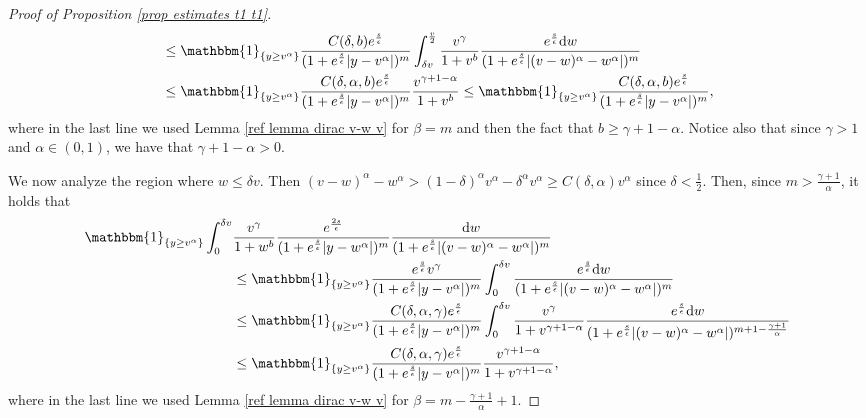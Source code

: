 \documentclass[11pt]{article}
\numberwithin{equation}{section}
\newcommand{\der}{\textup{d}}
\begin{document}
\begin{proof}[Proof of Proposition 
\ref{prop estimates t1 t1}]
\begin{align}
&\leq  \mathbbm{1}_{\{y\geq v^{\alpha}\}} \frac{C(\delta,b)e^{\frac{s}{\epsilon}}}{(1+e^{\frac{s}{\epsilon}}|y-v^{\alpha}|)^{m}}  \int_{\delta v}^{\frac{v}{2}} \frac{v^{\gamma}}{1+v^{b}}\frac{e^{\frac{s}{\epsilon}}\der w}{(1+e^{\frac{s}{\epsilon}}|(v-w)^{\alpha}-w^{\alpha}|)^{m}}\nonumber\\
&\leq  \mathbbm{1}_{\{y\geq v^{\alpha}\}} \frac{C(\delta,\alpha,b) e^{\frac{s}{\epsilon}}}{(1+e^{\frac{s}{\epsilon}}|y-v^{\alpha}|)^{m}}   \frac{ v^{\gamma+1-\alpha}}{1+v^{b}}\leq \mathbbm{1}_{\{y\geq v^{\alpha}\}}\frac{C(\delta,\alpha,b) e^{\frac{s}{\epsilon}}}{(1+e^{\frac{s}{\epsilon}}|y-v^{\alpha}|)^{m}},\label{part one}
\end{align}
where in the last line we used Lemma \ref{ref lemma dirac v-w v} for $\beta=m$ and then the fact that $b\geq \gamma+1-\alpha$. Notice also that since $\gamma>1$ and $\alpha\in(0,1)$, we have that $\gamma+1-\alpha>0$.

We now analyze the region where $w\leq \delta v$. Then $(v-w)^{\alpha}-w^{\alpha}>(1-\delta)^{\alpha}v^{\alpha}-\delta^{\alpha} v^{\alpha}\geq C(\delta,\alpha) v^{\alpha}$ since $\delta<\frac{1}{2}$. Then, since $m>\frac{\gamma+1}{\alpha}$, it holds that
  \begin{align}\label{part two}
    \mathbbm{1}_{\{y\geq v^{\alpha}\}}\int_{0}^{\delta v} & \frac{v^{\gamma}}{1+w^{b}}\frac{e^{\frac{2s}{\epsilon}}}{(1+e^{\frac{s}{\epsilon}}|y-w^{\alpha}|)^{m}}\frac{\der w}{(1+e^{\frac{s}{\epsilon}}|(v-w)^{\alpha}-w^{\alpha}|)^{m}}\nonumber\\
&\leq   \mathbbm{1}_{\{y\geq v^{\alpha}\}} \frac{e^{\frac{s}{\epsilon}} v^{\gamma}}{(1+e^{\frac{s}{\epsilon}}|y-v^{\alpha}|)^{m}}   \int_{0}^{\delta v} \frac{e^{\frac{s}{\epsilon}}\der w}{(1+e^{\frac{s}{\epsilon}}|(v-w)^{\alpha}-w^{\alpha}|)^{m}}\nonumber\\
&\leq \mathbbm{1}_{\{y\geq v^{\alpha}\}}\frac{C(\delta,\alpha,\gamma) e^{\frac{s}{\epsilon}}}{(1+e^{\frac{s}{\epsilon}}|y-v^{\alpha}|)^{m}}  \int_{0}^{\delta v} \frac{ v^{\gamma}}{1+v^{\gamma+1-\alpha}}\frac{e^{\frac{s}{\epsilon}}\der w}{(1+e^{\frac{s}{\epsilon}}|(v-w)^{\alpha}-w^{\alpha}|)^{m+1-\frac{\gamma+1}{\alpha}}}\nonumber\\
&\leq    \mathbbm{1}_{\{y\geq v^{\alpha}\}}\frac{C(\delta,\alpha,\gamma) e^{\frac{s}{\epsilon}}}{(1+e^{\frac{s}{\epsilon}}|y-v^{\alpha}|)^{m}}   \frac{v^{\gamma+1-\alpha}}{1+v^{\gamma+1-\alpha}},
\end{align}
where in the last line we used Lemma \ref{ref lemma dirac v-w v} for $\beta=m-\frac{\gamma+1}{\alpha}+1$.


\end{proof}
\end{document}
